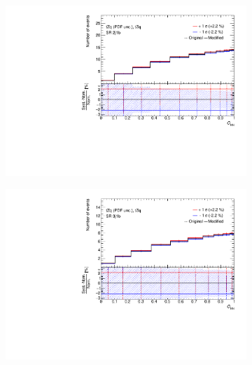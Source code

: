 
  
\setcounter{figure}{11} 
\begin{figure}[!h] 
 \begin{subfigure}[b]{0.33\linewidth}
    \centering
    \includegraphics[width=\textwidth]{ubonn-thesis/Chapters/Chapters_07/Figure/Data/Systematic/tZq_pdf/SR_2j1b_tZq_tZq_XS_PDFunc.pdf} 
    \caption{}
  \end{subfigure}%
  \begin{subfigure}[b]{0.33\linewidth}
    \centering
    \includegraphics[width=\textwidth]{ubonn-thesis/Chapters/Chapters_07/Figure/Data/Systematic/tZq_pdf/SR_3j1b_tZq_tZq_XS_PDFunc.pdf} 
    \caption{}
  \end{subfigure} 
  \begin{subfigure}[b]{0.33\linewidth}

\end{subfigure}
\end{figure}
